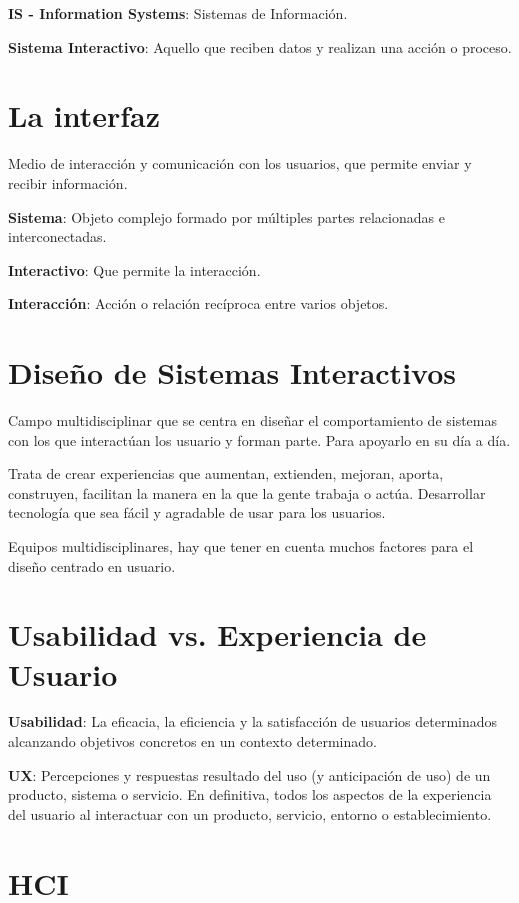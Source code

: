 \documentclass[12pt]{report} %
\begin{document}
\textbf{IS - Information Systems}: Sistemas de Información.

\textbf{Sistema Interactivo}: Aquello que reciben datos y realizan una
acción o proceso.

\section{La interfaz}

Medio de interacción y comunicación con los usuarios, que permite enviar
y recibir información.

\textbf{Sistema}: Objeto complejo formado por múltiples partes
relacionadas e interconectadas.

\textbf{Interactivo}: Que permite la interacción.

\textbf{Interacción}: Acción o relación recíproca entre varios objetos.

\section{Diseño de Sistemas
Interactivos}

Campo multidisciplinar que se centra en diseñar el comportamiento de
sistemas con los que interactúan los usuario y forman parte. Para
apoyarlo en su día a día.

Trata de crear experiencias que aumentan, extienden, mejoran, aporta,
construyen, facilitan la manera en la que la gente trabaja o actúa.
Desarrollar tecnología que sea fácil y agradable de usar para los
usuarios.

Equipos multidisciplinares, hay que tener en cuenta muchos factores para
el diseño centrado en usuario.

\section{Usabilidad vs. Experiencia de
Usuario}

\textbf{Usabilidad}: La eficacia, la eficiencia y la satisfacción de
usuarios determinados alcanzando objetivos concretos en un contexto
determinado.

\textbf{UX}: Percepciones y respuestas resultado del uso (y anticipación
de uso) de un producto, sistema o servicio. En definitiva, todos los
aspectos de la experiencia del usuario al interactuar con un producto,
servicio, entorno o establecimiento.

\section{HCI}
\end{document}
